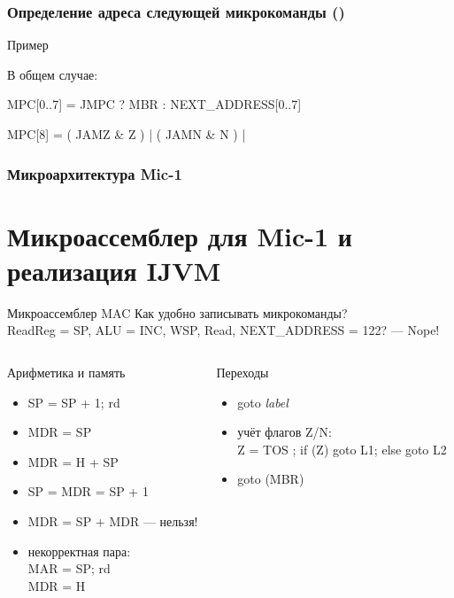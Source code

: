 \begin{frame}
\frametitle{Определение адреса следующей микрокоманды ()}

    Пример

    \pause
    В общем случае:

    \pause
    {\small \ttfamily
    MPC[0..7] = JMPC ? MBR : NEXT\_ADDRESS[0..7]}

    \pause
    {\small \ttfamily MPC[8] = ( JAMZ \& Z ) | ( JAMN \& N )
        | \color{gray}{NEXT\_ADDRESS[8]}}
\end{frame}

\begin{frame}[plain]
\frametitle{Микроархитектура Mic-1}
\vspace{-.3cm}
\end{frame}

\section{Микроассемблер для Mic-1 и реализация IJVM}

\begin{frame}{Микроассемблер MAC}
    \alert{Как удобно записывать микрокоманды?}\\
    {\small ReadReg = SP, ALU = INC, WSP, Read, NEXT\_ADDRESS = 122? \pause — Nope!}
    \pause

\begin{columns}
        \column{5cm}
    \begin{block}{Арифметика и память}
    \begin{itemize}
        \item \pause SP = SP + 1; rd
        \item \pause MDR = SP
        \item \pause MDR = H + SP
        \item \pause SP = MDR = SP + 1
        \item \pause MDR = SP + MDR \pause — нельзя!
        \item \pause некорректная пара:\\
            MAR = SP; rd \\
            MDR = H
    \end{itemize}
    \end{block}

        \column{6.5cm}
    \pause \begin{block}{Переходы}
    \begin{itemize}
        \item \pause goto \textit{label}
        \item \pause учёт флагов Z/N:\\
            {\small Z = TOS ; if (Z) goto L1; else goto L2}
        \item \pause goto (MBR)
    \end{itemize}
    \end{block}

\end{columns}
\end{frame}


